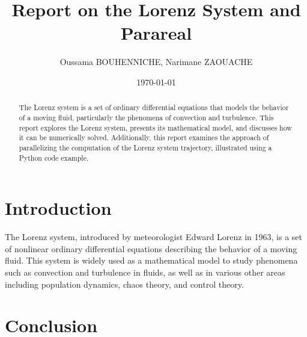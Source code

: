 \documentclass{article}
\title{Report on the Lorenz System and Parareal}
\author{Oussama  BOUHENNICHE, 
Narimane ZAOUACHE}
\date{\today}
\begin{document}
\maketitle

\begin{abstract}
The Lorenz system is a set of ordinary differential equations that models the behavior of a moving fluid, 
particularly the phenomena of convection and turbulence. This report explores the Lorenz system, presents its mathematical model, 
and discusses how it can be numerically solved. Additionally, this report examines the approach of parallelizing the computation of the Lorenz system trajectory, 
illustrated using a Python code example.
\end{abstract}

\section{Introduction}
The Lorenz system, introduced by meteorologist Edward Lorenz in 1963, 
is a set of nonlinear ordinary differential equations describing the behavior of a moving fluid. 
This system is widely used as a mathematical model to study phenomena such as convection and turbulence in fluids,
 as well as in various other areas including population dynamics, chaos theory, and control theory.



 



\section{Conclusion}
\end{document}
